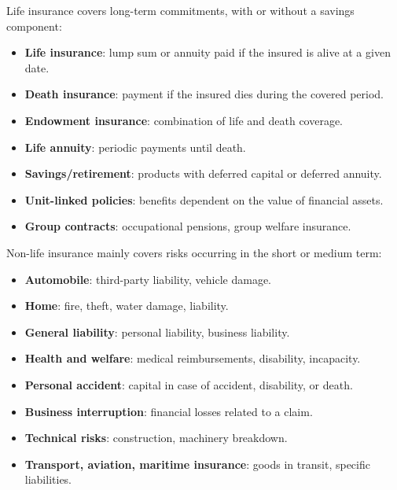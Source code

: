 \begin{f}
	
	Life insurance covers long-term commitments, with or without a savings component:
	\begin{itemize}[nosep]
		\item \textbf{Life insurance}: lump sum or annuity paid if the insured is alive at a given date.
		\item \textbf{Death insurance}: payment if the insured dies during the covered period.
		\item \textbf{Endowment insurance}: combination of life and death coverage.
		\item \textbf{Life annuity}: periodic payments until death.
		\item \textbf{Savings/retirement}: products with deferred capital or deferred annuity.
		\item \textbf{Unit-linked policies}: benefits dependent on the value of financial assets.
		\item \textbf{Group contracts}: occupational pensions, group welfare insurance.
	\end{itemize}
	
	
	Non-life insurance mainly covers risks occurring in the short or medium term:
	\begin{itemize}[nosep]
		\item \textbf{Automobile}: third-party liability, vehicle damage.
		\item \textbf{Home}: fire, theft, water damage, liability.
		\item \textbf{General liability}: personal liability, business liability.
		\item \textbf{Health and welfare}: medical reimbursements, disability, incapacity.
		\item \textbf{Personal accident}: capital in case of accident, disability, or death.
		\item \textbf{Business interruption}: financial losses related to a claim.
		\item \textbf{Technical risks}: construction, machinery breakdown.
		\item \textbf{Transport, aviation, maritime insurance}: goods in transit, specific liabilities.
	\end{itemize}
	

\end{f}
